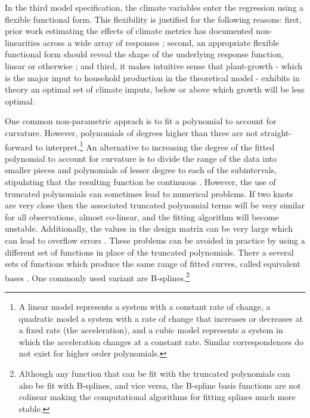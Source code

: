 \documentclass[a4paper,12pt]{article}
\theoremstyle{plain}
\theoremstyle{definition}
\theoremstyle{definition}
\theoremstyle{definition}
\theoremstyle{definition}
\begin{document}
In the third model specification, the climate variables enter the regression using a flexible functional form. This flexibility is justified for the following reasons: first, prior work estimating the effects of climate metrics has documented non-linearities across a wide array of responses \citep{Carleton2016}; second, an appropriate flexible functional form should reveal the shape of the underlying response function, linear or otherwise \citep{Hsiang2016a}; and third, it makes intuitive sense that plant-growth - which is the major input to household production in the theoretical model - exhibits in theory an optimal set of climate imputs, below or above which growth will be less optimal.

One common non-parametric apprach is to fit a polynomial to account for curvature. However, polynomials of degrees higher than three are not straight-forward to interpret.\footnote{A linear model represents a system with a constant rate of change, a quadratic model a system with a rate of change that increases or decreases at a fixed rate (the acceleration), and a cubic model represents a system in which the acceleration changes at a constant rate. Similar correspondences do not exist for higher order polynomials.} An alternative to increasing the degree of the fitted polynomial to account for curvature is to divide the range of the data into smaller pieces and polynomials of lesser degree to each of the subintervals, stipulating that the resulting function be continuous \citep[see e.g.][pp. 275- 279]{greene2018}. However, the use of truncated polynomials can sometimes lead to numerical problems. If two knots are very close then the associated truncated polynomial terms will be very similar for all observations, almost co-linear, and the fitting algorithm will become unstable. Additionally, the values in the design matrix can be very large which can lead to overflow errors \citep[see e.g.,][]{hastie2009a}. These problems can be avoided in practice by using a different set of functions in place of the truncated polynomials. There a several sets of functions which produce the same range of fitted curves, called equivalent bases \citep{hastie1987,hastie2009a}. One commonly used variant are B-splines.\footnote{Although any function that can be fit with the truncated polynomials can also be fit with B-splines, and vice versa, the B-spline basis functions are not colinear making the computational algorithms for fitting splines much more stable.}  
\end{document}
